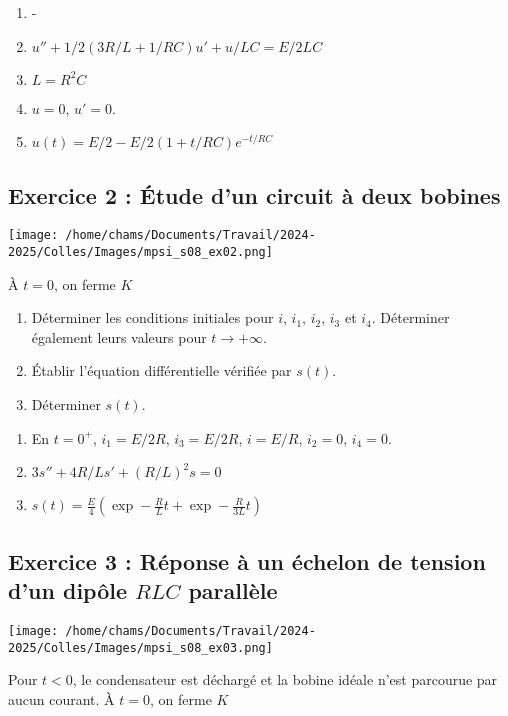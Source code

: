 \begin{enumerate}
	\item - 
	\item $u'' + 1/2(3R/L + 1/RC)u' + u/LC = E/2LC$
	\item $L = R^2 C$
	\item $u=0$, $u'=0$.
	\item $u(t) = E/2 - E/2(1+t/RC)e^{-t/RC}$
\end{enumerate}

\subsection{Exercice 2 : Étude d'un circuit à deux bobines}

\begin{minipage}[c]{\linewidth/2}
	\texttt{[image: /home/chams/Documents/Travail/2024-2025/Colles/Images/mpsi\_s08\_ex02.png]}
\end{minipage}%
\begin{minipage}[c]{\linewidth/2}
	À $t=0$, on ferme $K$
\end{minipage}

\begin{enumerate}
	\item Déterminer les conditions initiales pour $i$, $i_1$, $i_2$, $i_3$ et $i_4$. Déterminer également leurs valeurs pour $t\rightarrow+\infty$.
	\item Établir l'équation différentielle vérifiée par $s(t)$.
	\item Déterminer $s(t)$. 
\end{enumerate}

\begin{enumerate}
	\item En $t=0^+$, $i_1=E/2R$, $i_3=E/2R$, $i=E/R$, $i_2=0$, $i_4=0$.
	\item $3s'' + 4R/L s' + (R/L)^2 s = 0$
	\item $s(t) = \frac{E}{4} \left( \exp -\frac{R}{L}t +  \exp -\frac{R}{3L}t \right)$
\end{enumerate}


\subsection{Exercice 3 : Réponse à un échelon de tension d'un dipôle $RLC$ parallèle}

\begin{minipage}[c]{\linewidth/2}
	\texttt{[image: /home/chams/Documents/Travail/2024-2025/Colles/Images/mpsi\_s08\_ex03.png]}
\end{minipage}%
\begin{minipage}[c]{\linewidth/2}
	Pour $t<0$, le condensateur est déchargé et la bobine idéale n'est parcourue par aucun courant. À $t=0$, on ferme $K$
\end{minipage}

